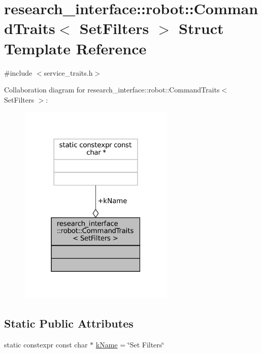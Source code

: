 \hypertarget{structresearch__interface_1_1robot_1_1CommandTraits_3_01SetFilters_01_4}{}\section{research\+\_\+interface\+:\+:robot\+:\+:Command\+Traits$<$ Set\+Filters $>$ Struct Template Reference}
\label{structresearch__interface_1_1robot_1_1CommandTraits_3_01SetFilters_01_4}


{\ttfamily \#include $<$service\+\_\+traits.\+h$>$}



Collaboration diagram for research\+\_\+interface\+:\+:robot\+:\+:Command\+Traits$<$ Set\+Filters $>$\+:
\nopagebreak
\begin{figure}[H]
\begin{center}
\leavevmode
\includegraphics[width=211pt]{structresearch__interface_1_1robot_1_1CommandTraits_3_01SetFilters_01_4__coll__graph}
\end{center}
\end{figure}
\subsection*{Static Public Attributes}
\begin{DoxyCompactItemize}
\item 
static constexpr const char $\ast$ \hyperlink{structresearch__interface_1_1robot_1_1CommandTraits_3_01SetFilters_01_4_a5a3d5120212b82f96867cff232a5f79a}{k\+Name} = \char`\"{}Set Filters\char`\"{}
\end{DoxyCompactItemize}


